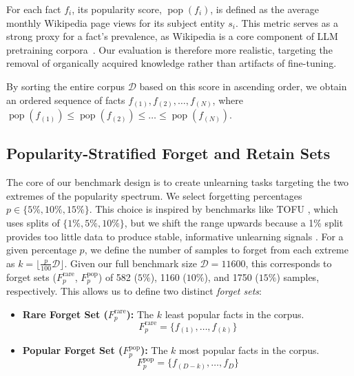 For each fact $f_i$, its popularity score, $\operatorname{pop}(f_i)$, is defined as the average monthly Wikipedia page views for its subject entity $s_i$.
This metric serves as a strong proxy for a fact's prevalence, as Wikipedia is a core component of LLM pretraining corpora~\cite{gao2020pile, dodge2021documenting}. Our evaluation is therefore more realistic, targeting the removal of organically acquired knowledge rather than artifacts of fine-tuning.


By sorting the entire corpus $\mathcal{D}$ based on this score in ascending order, we obtain an ordered sequence of facts $f_{(1)}, f_{(2)}, \dots, f_{(N)}$, where $\operatorname{pop}(f_{(1)}) \le \operatorname{pop}(f_{(2)}) \le \dots \le \operatorname{pop}(f_{(N)})$.

\subsection{Popularity-Stratified Forget and Retain Sets}
\label{subsec:popular-strat}

The core of our benchmark design is to create unlearning tasks targeting the two extremes of the popularity spectrum. We select forgetting percentages \(p \in \{5\%,10\%,15\%\}\). This choice is inspired by benchmarks like TOFU \cite{maini2024tofu}, which uses splits of \(\{1\%,5\%,10\%\}\), but we shift the range upwards because a 1\% split provides too little data to produce stable, informative unlearning signals \cite{pal2025llm}. For a given percentage $p$, we define the number of samples to forget from each extreme as $k = \lfloor \frac{p}{100}\mathcal{D} \rfloor$. Given our full benchmark size \( \mathcal{D} = 11600 \), this corresponds to forget sets (\( F_p^{\text{rare}} \), \( F_p^{\text{pop}} \)) of 582 (\( 5\% \)), 1160 (\( 10\% \)), and 1750 (\( 15\% \)) samples, respectively.
This allows us to define two distinct \emph{forget sets}:
\begin{itemize}
    \item \textbf{Rare Forget Set ($F_p^{\text{rare}}$):} The $k$ least popular facts in the corpus.
    \begin{equation}
      F_p^{\text{rare}} = \{ f_{(1)}, \dots, f_{(k)} \}
    \end{equation}
    \item \textbf{Popular Forget Set ($F_p^{\text{pop}}$):} The $k$ most popular facts in the corpus.
    \begin{equation}
      F_p^{\text{pop}} = \{ f_{(D - k)}, \dots, f_{D} \}
    \end{equation}
\end{itemize}


